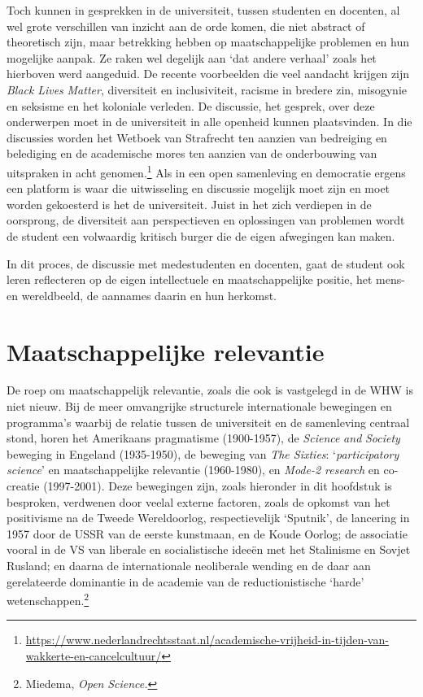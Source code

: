 \documentclass[smallauthor, chapterhaspagenum, nochapterinheader, pagenuminheader,  bigchapnum,medium2, tocpages, garamond, titleinheader]{jote-book}
\begin{document}
	Toch kunnen in gesprekken in de universiteit, tussen studenten en docenten, al wel grote verschillen van inzicht aan de orde komen, die niet abstract of theoretisch zijn, maar betrekking hebben op maatschappelijke problemen en hun mogelijke aanpak. Ze raken wel degelijk aan ‘dat andere verhaal' zoals het hierboven werd aangeduid. De recente voorbeelden die veel aandacht krijgen zijn \emph{Black }\emph{Lives}\emph{ Matter}, diversiteit en inclusiviteit, racisme in bredere zin, misogynie en seksisme en het koloniale verleden. De discussie, het gesprek, over deze onderwerpen moet in de universiteit in alle openheid kunnen plaatsvinden. In die discussies worden het Wetboek van Strafrecht ten aanzien van bedreiging en belediging en de academische mores ten aanzien van de onderbouwing van uitspraken in acht genomen.\footnote{\href{https://www.nederlandrechtsstaat.nl/academische-vrijheid-in-tijden-van-wakkerte-en-cancelcultuur/}{https://www.nederlandrechtsstaat.nl/academische-vrijheid-in-tijden-van-wakkerte-en-cancelcultuur/} } Als in een open samenleving en democratie ergens een platform is waar die uitwisseling en discussie mogelijk moet zijn en moet worden gekoesterd is het de universiteit. Juist in het zich verdiepen in de oorsprong, de diversiteit aan perspectieven en oplossingen van problemen wordt de student een volwaardig kritisch burger die de eigen afwegingen kan maken.



	In dit proces, de discussie met medestudenten en docenten, gaat de student ook leren reflecteren op de eigen intellectuele en maatschappelijke positie, het mens- en wereldbeeld, de aannames daarin en hun herkomst.



	\section{Maatschappelijke relevantie}



	De roep om maatschappelijk relevantie, zoals die ook is vastgelegd in de WHW is niet nieuw. Bij de meer omvangrijke structurele internationale bewegingen en programma's waarbij de relatie tussen de universiteit en de samenleving centraal stond, horen het Amerikaans pragmatisme (1900-1957), de \emph{Science}\emph{ }\emph{and}\emph{ Society} beweging in Engeland (1935-1950), de beweging van \emph{The Sixties}: ‘\emph{participatory}\emph{ }\emph{science}' en maatschappelijke relevantie (1960-1980), en \emph{Mode}\emph{-}\emph{2 research} en co-creatie (1997-2001). Deze bewegingen zijn, zoals hieronder in dit hoofdstuk is besproken, verdwenen door veelal externe factoren, zoals de opkomst van het positivisme na de Tweede Wereldoorlog, respectievelijk ‘Sputnik', de lancering in 1957 door de USSR van de eerste kunstmaan, en de Koude Oorlog; de associatie vooral in de VS van liberale en socialistische ideeën met het Stalinisme en Sovjet Rusland; en daarna de internationale neoliberale wending en de daar aan gerelateerde dominantie in de academie van de reductionistische ‘harde' wetenschappen.\footnote{Miedema, \emph{Open }\emph{Science}\emph{.}}
\end{document}
